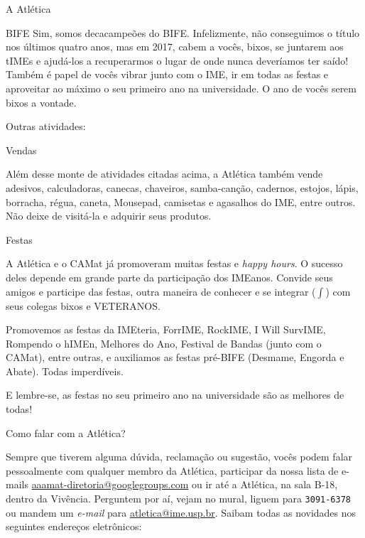 \begin{secao}{A Atlética}
\begin{subsecao}{BIFE}
Sim, somos decacampeões do BIFE.  Infelizmente, não conseguimos o título nos
últimos quatro anos, mas em 2017, cabem a vocês, bixos, se juntarem aos tIMEs e
ajudá-los a recuperarmos o lugar de onde nunca deveríamos ter saído! Também é
papel de vocês vibrar junto com o IME, ir em todas as festas e aproveitar ao máximo o
seu primeiro ano na universidade. O ano de vocês serem bixos a vontade.

\end{subsecao}

Outras atividades:

\begin{subsecao}{Vendas}

Além desse monte de atividades citadas acima, a Atlética também vende
adesivos, calculadoras, canecas, chaveiros, samba-canção, cadernos, estojos,
lápis, borracha, régua, caneta, Mousepad, camisetas e agasalhos do IME,
entre outros. Não deixe de visitá-la e adquirir seus produtos.

\end{subsecao}

\begin{subsecao}{Festas}

A Atlética e o CAMat já promoveram muitas festas e \textit{happy hours}. O sucesso
deles depende em grande parte da participação dos IMEanos. Convide seus
amigos e participe das festas, outra maneira de conhecer e se
integrar ($\int$) com seus colegas bixos e VETERANOS.

Promovemos as festas da IMEteria, ForrIME, RockIME, I Will SurvIME, Rompendo o hIMEn,
Melhores do Ano, Festival de Bandas (junto com o CAMat), entre outras, e
auxiliamos as festas pré-BIFE (Desmame, Engorda e Abate). Todas imperdíveis.

E lembre-se, as festas no seu primeiro ano na universidade são as melhores de
todas!

\end{subsecao}

\begin{subsecao}{Como falar com a Atlética?}

Sempre que tiverem alguma dúvida, reclamação ou sugestão, vocês podem falar
pessoalmente com qualquer membro da Atlética, participar da nossa lista de e-mails \url{aaamat-diretoria@googlegroups.com} ou ir até a Atlética, na sala
B-18, dentro da Vivência.  Perguntem por aí, vejam no mural, liguem para {\tt 3091-6378} ou mandem um \textit{e-mail} para \url{atletica@ime.usp.br}.
Saibam todas as novidades nos seguintes endereços eletrônicos:


\end{subsecao}
\end{secao}

